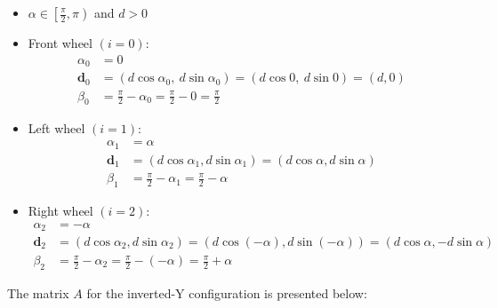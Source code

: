 \documentclass[11pt,a4paper]{article}
\newcommand{\vect}[1]{\bm{#1}}       %
\begin{document}
\begin{itemize}
    \item \(\alpha \in \left[\frac{\pi}{2}, \pi\right)\) and \(d > 0\)
    \item Front wheel \((i = 0)\):
          \[
              \begin{aligned}
                  \alpha_0   & = 0                                                              \\
                  \vect{d}_0 & = (d\cos\alpha_0,\ d\sin\alpha_0) = (d\cos 0,\ d\sin 0) = (d, 0) \\
                  \beta_0    & = \frac{\pi}{2} - \alpha_0 = \frac{\pi}{2} - 0 = \frac{\pi}{2}
              \end{aligned}
          \]
    \item Left wheel \((i = 1)\):
          \[
              \begin{aligned}
                  \alpha_1   & = \alpha                                                      \\
                  \vect{d}_1 & = (d\cos\alpha_1, d\sin\alpha_1) = (d\cos\alpha, d\sin\alpha) \\
                  \beta_1    & = \frac{\pi}{2} - \alpha_1 = \frac{\pi}{2} - \alpha
              \end{aligned}
          \]
    \item Right wheel \((i = 2)\):
          \[
              \begin{aligned}
                  \alpha_2   & = -\alpha                                                                                         \\
                  \vect{d}_2 & = (d\cos\alpha_2, d\sin\alpha_2) = (d\cos(-\alpha), d\sin(-\alpha)) = (d\cos\alpha, -d\sin\alpha) \\
                  \beta_2    & = \frac{\pi}{2} - \alpha_2 = \frac{\pi}{2} - (-\alpha) = \frac{\pi}{2} + \alpha
              \end{aligned}
          \]
\end{itemize}

The matrix \(A\) for the inverted-Y configuration is presented below:
\end{document}
